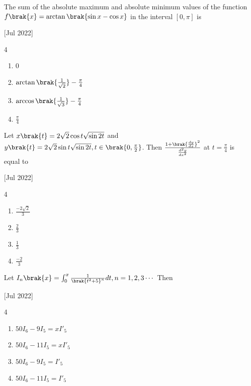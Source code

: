     \item The sum of the absolute maximum and absolute minimum values of the function $f\brak{x}=\arctan\brak{\sin x-\cos x}$ in the interval $\left[0,\pi\right]$ is
    
    \hfill{[Jul 2022]}

        \begin{multicols}{4}
            \begin{enumerate}
                \item 0
                \item $\arctan\brak{\frac{1}{\sqrt{2}}}-\frac{\pi}{4}$
                \item $\arccos\brak{\frac{1}{\sqrt{3}}}-\frac{\pi}{4}$
                \item $\frac{\pi}{4}$
            \end{enumerate}
        \end{multicols}
		
    \item Let $x\brak{t}=2\sqrt{2}\cos{t}\sqrt{\sin{2t}}$ and $y\brak{t}=2\sqrt{2}\sin{t}\sqrt{\sin{2t}},t\in\brak{0,\frac{\pi}{2}}$. Then $\frac{1+\brak{\frac{dy}{dx}}^2}{\frac{d^2y}{dx^2}}$ at $t=\frac{\pi}{4}$ is equal to
    
    \hfill{[Jul 2022]}

        \begin{multicols}{4}
            \begin{enumerate}
                \item $\frac{-2\sqrt{2}}{3}$
                \item $\frac{2}{3}$
                \item $\frac{1}{3}$
                \item $\frac{-2}{3}$
            \end{enumerate}
        \end{multicols}

    \item Let $I_n\brak{x}=\int_0^x\frac{1}{\brak{t^2+5}^n}dt,n=1,2,3\cdots$ Then 
    
    \hfill{[Jul 2022]}

        \begin{multicols}{4}
            \begin{enumerate}
                \item $50I_6-9I_5=xI'_5$
                \item $50I_6-11I_5=xI'_5$
                \item $50I_6-9I_5=I'_5$
                \item $50I_6-11I_5=I'_5$
            \end{enumerate}
        \end{multicols}

